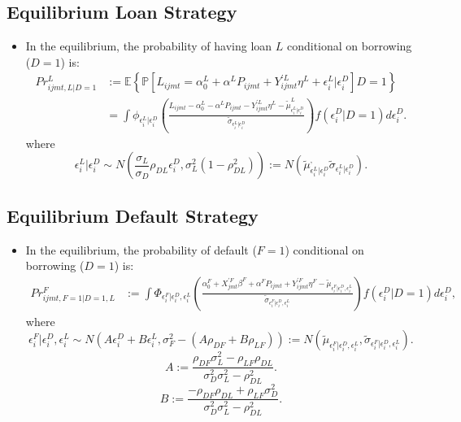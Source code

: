 \documentclass[
]{book}
\providecommand{\tightlist}{%
  \setlength{\itemsep}{0pt}\setlength{\parskip}{0pt}}
\begin{document}
\hypertarget{equilibrium-loan-strategy}{%
\subsection{Equilibrium Loan Strategy}\label{equilibrium-loan-strategy}}

\begin{itemize}
\tightlist
\item
  In the equilibrium, the probability of having loan \(L\) conditional on borrowing (\(D = 1\)) is:
  \begin{equation}
  \begin{split}
  Pr_{ijmt, L|D = 1}^L &:= \mathbb{E}\left\{\mathbb{P}[L_{ijmt} = \alpha_0^L + \alpha^L P_{ijmt} + Y_{ijmt}^{\prime L} \eta^L + \epsilon_i^L|\epsilon_i^D] D = 1 \right\}\\
  &= \int \phi_{\epsilon_i^L|\epsilon_i^D} \left(\frac{L_{ijmt} - \alpha_0^L - \alpha^L P_{ijmt} - Y_{ijmt}^{\prime L} \eta^L - \tilde{\mu}_{\epsilon_i^L|\epsilon_i^D}^L}{\tilde{\sigma}_{\epsilon_i^L|\epsilon_i^D}} \right) f(\epsilon_i^D|D = 1) d \epsilon_i^D.
  \end{split} \label{eq:loan-strategy}
  \end{equation}
  where
  \[
  \epsilon_i^L | \epsilon_i^D \sim N\left(\frac{\sigma_L}{\sigma_D} \rho_{DL} \epsilon_i^D, \sigma_L^2 (1 - \rho_{DL}^2) \right) := N(\tilde{\mu}_{\epsilon_i^L|\epsilon_i^D}^, \tilde{\sigma}_{\epsilon_i^L|\epsilon_i^D}).
  \]
\end{itemize}

\hypertarget{equilibrium-default-strategy}{%
\subsection{Equilibrium Default Strategy}\label{equilibrium-default-strategy}}

\begin{itemize}
\tightlist
\item
  In the equilibrium, the probability of default (\(F = 1\)) conditional on borrowing (\(D = 1\)) is:
  \begin{equation}
  \begin{split}
  Pr_{ijmt, F = 1| D = 1, L}^F &:= \int \Phi_{\epsilon_i^F|\epsilon_i^D, \epsilon_i^L}\left(\frac{\alpha_0^F + X_{jmt}^{\prime F} \beta^F + \alpha^F P_{ijmt} + Y_{ijmt}^{\prime F} \eta^F - \tilde{\mu}_{\epsilon_i^F|\epsilon_i^D, \epsilon_i^L}}{\tilde{\sigma}_{\epsilon_i^F | \epsilon_i^D, \epsilon_i^L}} \right) f(\epsilon_i^D | D = 1) d\epsilon_i^D,
  \end{split} \label{eq:default-strategy}
  \end{equation}
  where
  \[
  \epsilon_i^F | \epsilon_i^D, \epsilon_i^L \sim N(A \epsilon_i^D + B \epsilon_i^L, \sigma_F^2 - (A \rho_{DF} + B \rho_{LF})) := N(\tilde{\mu}_{\epsilon_i^F|\epsilon_i^D, \epsilon_i^L}, \tilde{\sigma}_{\epsilon_i^F | \epsilon_i^D, \epsilon_i^L}).
  \]
  \[
  A := \frac{\rho_{DF} \sigma_L^2 - \rho_{LF} \rho_{DL}}{\sigma_D^2 \sigma_L^2 - \rho_{DL}^2}.
  \]
  \[
  B := \frac{-\rho_{DF} \rho_{DL} + \rho_{LF} \sigma_D^2}{\sigma_D^2 \sigma_L^2 - \rho_{DL}^2}.
  \]
\end{itemize}
\end{document}

